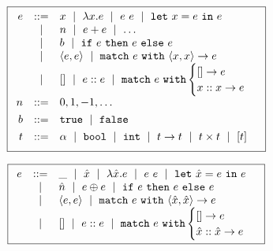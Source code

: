 \begin{figure}
\small
\centering
  \begin{minipage}[c]{\linewidth}
  \[
  \boxed{
  \begin{array}{rcl}
  e & ::=    & x \ \mid\  \lambda x. e \ \mid\  e\ e \ \mid\  \mathtt{let}\ x = e\ \mathtt{in}\ e \\
    & \ \mid\  & n \ \mid\  e + e \ \mid\  \ldots \\
    & \ \mid\  & b \ \mid\  \mathtt{if}\ e\ \mathtt{then}\ e\ \mathtt{else}\ e \\
    & \ \mid\  & \langle e, e \rangle \ \mid\  \mathtt{match}\ e\ \mathtt{with}\ \langle x, x \rangle \to e \\
    & \ \mid\  & \mathtt{[]} \ \mid\  e :: e \ \mid\  \mathtt{match}\ e\ \mathtt{with} \begin{cases} \mathtt{[]} \to e\\ x :: x \to e \end{cases} \\[0.05in]

  n & ::= &  0, 1, -1, \ldots \\[0.05in]

  b & ::= &  \mathtt{true} \ \mid\  \mathtt{false} \\[0.05in]

  t & ::= & \alpha \ \mid\  \mathtt{bool} \ \mid\  \mathtt{int} \ \mid\  t \to t \ \mid\  t \times t \ \mid\  [t] \\[0.05in]
  \end{array}
  }
  \]
  \label{fig:ml-syntax}
  \end{minipage}
  \begin{minipage}[c]{\linewidth}
    \[
    \boxed{
    \begin{array}{rcl}
    e & ::=    & \_  \ \mid\  \hat{x} \ \mid\  \lambda \hat{x}. e \ \mid\  e\ e \ \mid\  \mathtt{let}\ \hat{x} = e\ \mathtt{in}\ e \\
      & \ \mid\  & \hat{n} \ \mid\  e \oplus e \ \mid\  \mathtt{if}\ e\ \mathtt{then}\ e\ \mathtt{else}\ e \\
      & \ \mid\  & \langle e, e \rangle \ \mid\  \mathtt{match}\ e\ \mathtt{with}\ \langle \hat{x}, \hat{x} \rangle \to e \\
      & \ \mid\  & \mathtt{[]} \ \mid\  e :: e \ \mid\  \mathtt{match}\ e\ \mathtt{with} \begin{cases} \mathtt{[]} \to e\\ \hat{x} :: \hat{x} \to e \end{cases} \\[0.05in]
    \end{array}
    }
    \]
    \label{fig:rtl-syntax}
  \end{minipage}
\end{figure}
